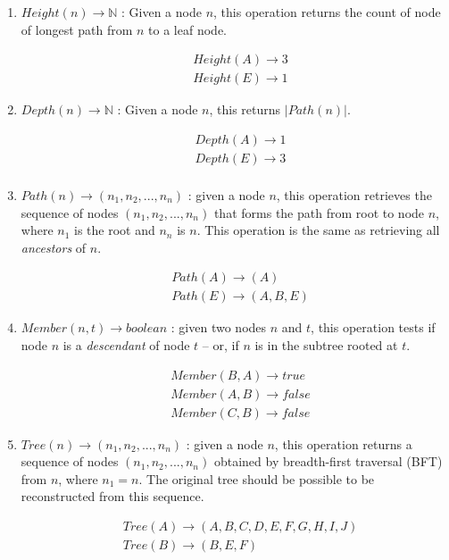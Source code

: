 \begin{enumerate}
\item $Height(n) \rightarrow \mathbb{N}$ : Given a node $n$, this operation returns the count of node of longest path from $n$ to a leaf node.

    \begin{align*}
    & Height(A) \rightarrow 3 \\
    & Height(E) \rightarrow 1
    \end{align*}
    
\item $Depth(n) \rightarrow \mathbb{N}$ : Given a node $n$, this returns $|Path(n)|$.

    \begin{align*}
    & Depth(A) \rightarrow 1 \\
    & Depth(E) \rightarrow 3 \\
    \end{align*}
    
\item $Path(n) \rightarrow (n_1, n_2, ..., n_n)$ : given a node $n$, this operation retrieves the sequence of nodes $(n_1, n_2, ..., n_n)$ that forms the path from root to node $n$, where $n_1$ is the root and $n_n$ is $n$. This operation is the same as retrieving all \emph{ancestors} of $n$.

    \begin{align*}
    & Path(A) \rightarrow (A) \\
    & Path(E) \rightarrow (A, B, E)
    \end{align*}
    
\item $Member(n, t) \rightarrow boolean$ : given two nodes $n$ and $t$, this operation tests if node $n$ is a \emph{descendant} of node $t$ -- or, if $n$ is in the subtree rooted at $t$.


    \begin{align*}
    & Member(B, A) \rightarrow true \\
    & Member(A, B) \rightarrow false \\
    & Member(C, B) \rightarrow false
    \end{align*}
    
\item $Tree(n) \rightarrow (n_1, n_2, ..., n_n)$ : given a node $n$, this operation returns a sequence of nodes $(n_1, n_2, ..., n_n)$ obtained by breadth-first traversal (BFT) from $n$, where $n_1 = n$. The original tree should be possible to be reconstructed from this sequence.

    \begin{align*}
    & Tree(A) \rightarrow (A, B, C, D, E, F, G, H, I, J) \\
    & Tree(B) \rightarrow (B, E, F) \\
    \end{align*}

\end{enumerate} %


